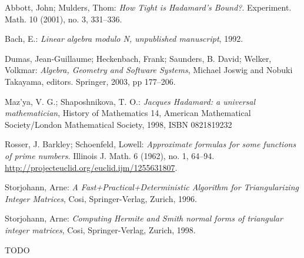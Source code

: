 \begin{thebibliography}{10}

Abbott, John; Mulders, Thom: \textit{How Tight is Hadamard's Bound?}.
Experiment. Math. 10 (2001), no. 3, 331--336.

Bach, E.: \textit{Linear algebra modulo N, unpublished manuscript}, 1992.

Dumas, Jean-Guillaume; Heckenbach, Frank; Saunders, B. David; Welker, Volkmar:
\textit{Algebra, Geometry and Software Systems}, Michael Joswig and Nobuki Takayama, editors. Springer, 2003, pp 177--206.

Maz'ya, V. G.; Shaposhnikova, T. O.: \textit{Jacques Hadamard: a universal mathematician},
History of Mathematics 14, American Mathematical Society/London Mathematical Society, 1998, ISBN 0821819232

Rosser, J. Barkley; Schoenfeld, Lowell: \textit{Approximate formulas for some functions of prime numbers.}
Illinois J. Math. 6 (1962), no. 1, 64--94. 
\url{http://projecteuclid.org/euclid.ijm/1255631807}.

Storjohann, Arne: \textit{A Fast+Practical+Deterministic Algorithm for Triangularizing Integer Matrices},
Cosi, Springer-Verlag, Zurich, 1996.

Storjohann, Arne: \textit{Computing Hermite and Smith normal forms
of triangular integer matrices},
Cosi, Springer-Verlag, Zurich, 1998.

TODO





\end{thebibliography}

\cleardoublepage
